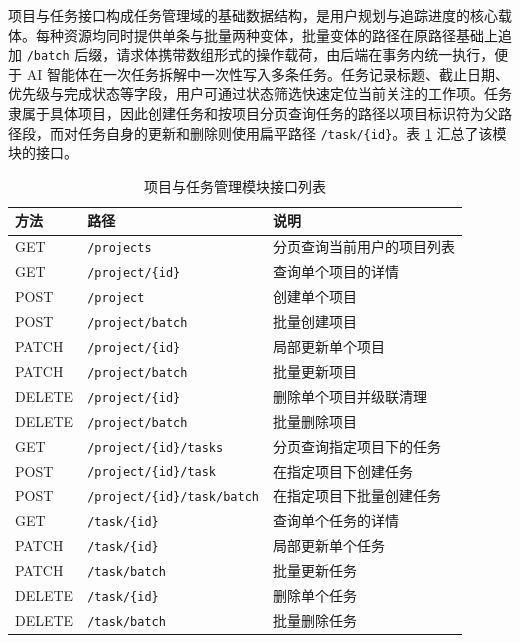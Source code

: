 \par 项目与任务接口构成任务管理域的基础数据结构，是用户规划与追踪进度的核心载体。每种资源均同时提供单条与批量两种变体，批量变体的路径在原路径基础上追加 \texttt{/batch} 后缀，请求体携带数组形式的操作载荷，由后端在事务内统一执行，便于 AI 智能体在一次任务拆解中一次性写入多条任务。任务记录标题、截止日期、优先级与完成状态等字段，用户可通过状态筛选快速定位当前关注的工作项。任务隶属于具体项目，因此创建任务和按项目分页查询任务的路径以项目标识符为父路径段，而对任务自身的更新和删除则使用扁平路径 \texttt{/task/\{id\}}。表 \ref{tab:api-project} 汇总了该模块的接口。

\begin{table}[htbp]
  \centering
  \caption{项目与任务管理模块接口列表}
  \label{tab:api-project}
  \begin{tabular}{p{2cm}p{5cm}p{6cm}}
    \hline
    方法 & 路径 & 说明 \\
    \hline
    GET & \texttt{/projects} & 分页查询当前用户的项目列表 \\
    GET & \texttt{/project/\{id\}} & 查询单个项目的详情 \\
    POST & \texttt{/project} & 创建单个项目 \\
    POST & \texttt{/project/batch} & 批量创建项目 \\
    PATCH & \texttt{/project/\{id\}} & 局部更新单个项目 \\
    PATCH & \texttt{/project/batch} & 批量更新项目 \\
    DELETE & \texttt{/project/\{id\}} & 删除单个项目并级联清理 \\
    DELETE & \texttt{/project/batch} & 批量删除项目 \\
    GET & \texttt{/project/\{id\}/tasks} & 分页查询指定项目下的任务 \\
    POST & \texttt{/project/\{id\}/task} & 在指定项目下创建任务 \\
    POST & \texttt{/project/\{id\}/task/batch} & 在指定项目下批量创建任务 \\
    GET & \texttt{/task/\{id\}} & 查询单个任务的详情 \\
    PATCH & \texttt{/task/\{id\}} & 局部更新单个任务 \\
    PATCH & \texttt{/task/batch} & 批量更新任务 \\
    DELETE & \texttt{/task/\{id\}} & 删除单个任务 \\
    DELETE & \texttt{/task/batch} & 批量删除任务 \\
    \hline
  \end{tabular}
\end{table}

